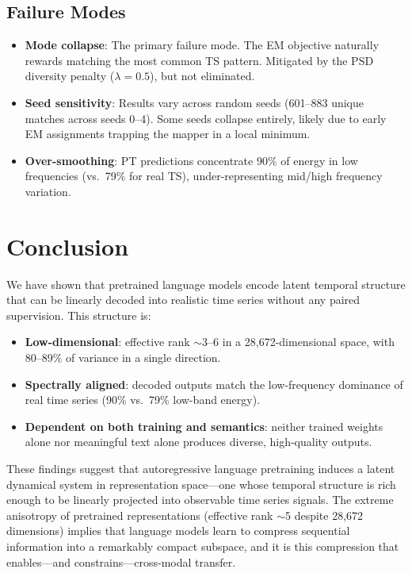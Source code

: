 \documentclass[11pt,a4paper]{article}
\begin{document}
\subsection{Failure Modes}

\begin{itemize}[nosep]
    \item \textbf{Mode collapse}: The primary failure mode. The EM objective naturally rewards matching the most common TS pattern. Mitigated by the PSD diversity penalty ($\lambda = 0.5$), but not eliminated.
    \item \textbf{Seed sensitivity}: Results vary across random seeds (601--883 unique matches across seeds 0--4). Some seeds collapse entirely, likely due to early EM assignments trapping the mapper in a local minimum.
    \item \textbf{Over-smoothing}: PT predictions concentrate 90\% of energy in low frequencies (vs.\ 79\% for real TS), under-representing mid/high frequency variation.
\end{itemize}

\section{Conclusion}

We have shown that pretrained language models encode latent temporal structure that can be linearly decoded into realistic time series without any paired supervision.
This structure is:
\begin{itemize}[nosep]
    \item \textbf{Low-dimensional}: effective rank $\sim$3--6 in a 28{,}672-dimensional space, with 80--89\% of variance in a single direction.
    \item \textbf{Spectrally aligned}: decoded outputs match the low-frequency dominance of real time series (90\% vs.\ 79\% low-band energy).
    \item \textbf{Dependent on both training and semantics}: neither trained weights alone nor meaningful text alone produces diverse, high-quality outputs.
\end{itemize}

These findings suggest that autoregressive language pretraining induces a latent dynamical system in representation space---one whose temporal structure is rich enough to be linearly projected into observable time series signals.
The extreme anisotropy of pretrained representations (effective rank $\sim$5 despite 28{,}672 dimensions) implies that language models learn to compress sequential information into a remarkably compact subspace, and it is this compression that enables---and constrains---cross-modal transfer.
\end{document}
